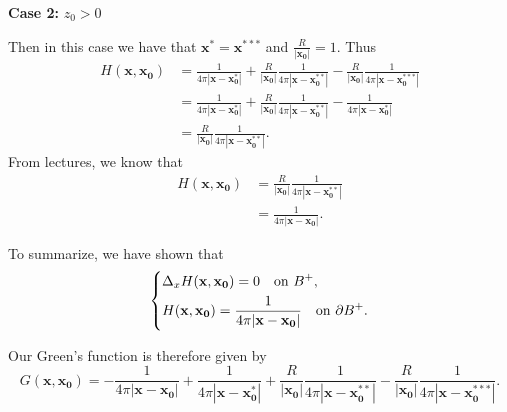 \documentclass{article}
\def\*#1{\mathbf{#1}}
\begin{document}
\textbf{Case 2:} $z_0 > 0$

Then in this case we have that $\*{x^{*}} = \*{x^{***}}$ and
$\frac{R}{|\*{x_0}|} = 1$. Thus
%
\begin{align*}
    H(\*{x}, \*{x_0}) &=
        \frac{1}{4 \pi |\*x - \*{x_0^*}|}
        + \frac{R}{|\*{x_0}|} \frac{1}{4 \pi |\*x - \*{x_0^{**}}|}
        - \frac{R}{|\*{x_0}|} \frac{1}{4 \pi |\*x - \*{x_0^{***}}|} \\
    &=
        \frac{1}{4 \pi |\*x - \*{x_0^*}|}
        + \frac{R}{|\*{x_0}|} \frac{1}{4 \pi |\*x - \*{x_0^{**}}|}
        - \frac{1}{4 \pi |\*x - \*{x_0^{*}}|} \\
    &=
        \frac{R}{|\*{x_0}|} \frac{1}{4 \pi |\*x - \*{x_0^{**}}|}
    .
\end{align*}
%
From lectures, we know that
%
\begin{align*}
    H(\*{x}, \*{x_0})
        &= \frac{R}{|\*{x_0}|} \frac{1}{4 \pi |\*x - \*{x_0^{**}}|} \\
        &= \frac{1}{4 \pi |\*x - \*{x_0}|}
    .
\end{align*}

To summarize, we have shown that
%
\begin{equation*}
    \begin{dcases}
        \Delta_x H(\*x, \*{x_0}) = 0 \quad \text{on } B^+, \\
        H(\*x, \*{x_0}) = \frac{1}{4 \pi |\*x - \*{x_0}|} \quad \text{on } \partial B^+.
    \end{dcases}
\end{equation*}

Our Green's function is therefore given by
%
\begin{equation*}
    G(\*x, \*{x_0}) =
        - \frac{1}{4 \pi |\*x - \*{x_0}|}
        + \frac{1}{4 \pi |\*x - \*{x_0^*}|}
        + \frac{R}{|\*{x_0}|} \frac{1}{4 \pi |\*x - \*{x_0^{**}}|}
        - \frac{R}{|\*{x_0}|} \frac{1}{4 \pi |\*x - \*{x_0^{***}}|}
    .
\end{equation*}
\end{document}

